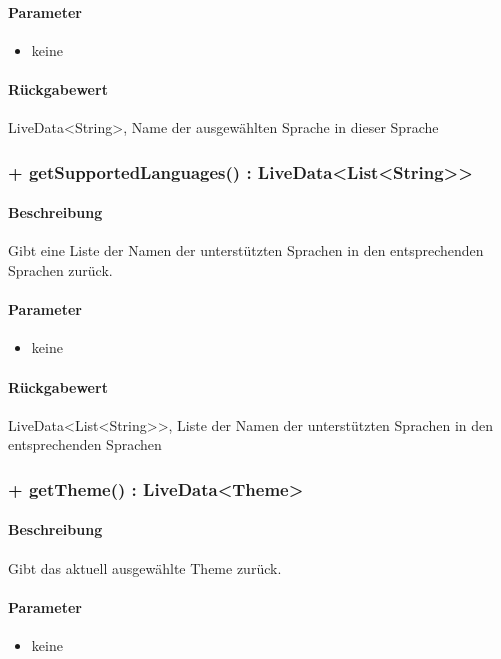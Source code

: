 \paragraph*{Parameter}
\begin{itemize}
    \item keine
\end{itemize}
\paragraph*{Rückgabewert}
LiveData<String>, Name der ausgewählten Sprache in dieser Sprache

\subsubsection{+ getSupportedLanguages() : LiveData<List<String>>}%
\paragraph*{Beschreibung}
Gibt eine Liste der Namen der unterstützten Sprachen in den entsprechenden Sprachen zurück.
\paragraph*{Parameter}
\begin{itemize}
    \item keine
\end{itemize}
\paragraph*{Rückgabewert}
LiveData<List<String>>, Liste der Namen der unterstützten Sprachen in den entsprechenden Sprachen

\subsubsection{+ getTheme() : LiveData<Theme>}%
\paragraph*{Beschreibung}
Gibt das aktuell ausgewählte Theme zurück.
\paragraph*{Parameter}
\begin{itemize}
    \item keine
\end{itemize}
